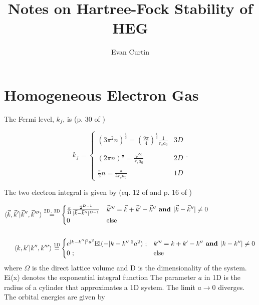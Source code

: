 \documentclass{revtex4}
\begin{document}
\title{Notes on Hartree-Fock Stability of HEG}
\author{Evan Curtin}
\maketitle


\section{Homogeneous Electron Gas}


The Fermi level, $k_f$, is (p. 30 of \cite{Guiliani2005})

\begin{equation}
k_f
=\begin{cases} 
      (3\pi^2n)^{\frac{1}{3}} = \left(\frac{9\pi}{4}\right)^{\frac{1}{3}}\frac{1}{r_sa_0} & 3D \\ \\
      (2\pi n)^{\frac{1}{2}} = \frac{\sqrt{2}}{r_sa_0}  & 2D \\
      \\
      \frac{\pi}{2}n = \frac{\pi}{4 r_s a_0}   & 1D 
   \end{cases}
   .
\end{equation}

The two electron integral is given by (eq. 12 of \cite{Delyon2008} and p. 16 of \cite{Guiliani2005})

\begin{subequations}
\begin{align}
\braket{\vec{k}, \vec{k}'|\vec{k}'',\vec{k}'''}\stackrel{\text{2D, 3D}}{=}&
	\begin{cases} 
	\frac{\pi}{\Omega}\frac{2^{D-1}}{|\vec{k}-\vec{k}''|^{D-1}} 
	& \vec{k}''' = \vec{k}+\vec{k}'-\vec{k}'' \textbf{ and } |\vec{k}-\vec{k}''| \neq 0 \\
	0 
	& \text{else}
	\end{cases}
\\ \nonumber \\
\braket{k, k'|k'',k'''}\stackrel{\text{1D}}{=}&
	\begin{cases} 
	e^{|k-k''|^2a^2}\text{Ei}(-|k-k''|^2a^2)\text{ ;}
	& k''' = k+k'-k'' \textbf{ and } |k-k''| \neq 0 \\
	0\text{ ;} 
	& \text{else}
	\end{cases}
\end{align}
\end{subequations}
where $\Omega$ is the direct lattice volume and D is the dimensionality of the system. Ei(x) 
denotes the exponential integral function The parameter $a$ in 1D is the radius of a cylinder
that approximates a 1D system. The limit $a \rightarrow 0$ diverges. The orbital energies are given 
by 
\end{document}
